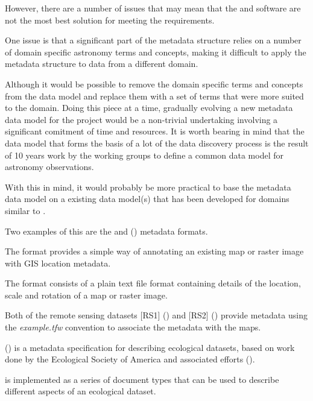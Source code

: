 \documentclass{article}
\begin{document}
However, there are a number of issues that may mean that the \cite{ivoa} and \cite{astro} software
are not the most best solution for meeting the \cite{trop} requirements.

One issue is that a significant part of the \cite{ivoa} metadata structure relies on a number of
domain specific astronomy terms and concepts, making it difficult to apply the \cite{ivoa}
metadata structure to data from a different domain.

Although it would be possible to remove the domain specific terms and concepts from
the \cite{ivoa} data model and replace them with a set of terms that were more suited to the
\cite{trop} domain.
Doing this piece at a time, gradually evolving a new metadata data model for the
\cite{trop} project would be a non-trivial undertaking involving a significant
comitment of time and resources.
It is worth bearing in mind that the \cite{ivoa} \cite{ivoa.obscore} data model
that forms the basis of a lot of the \cite{ivoa} data discovery process
is the result of 10 years work by the \cite{ivoa} working groups
to define a common data model for astronomy observations.

With this in mind, it would probably be more practical to base the \cite{trop} metadata
data model on a existing data model(s) that has been developed for domains similar to
\cite{trop}.

Two examples of this are the  and  (\cite{eml})
metadata formats.

The  format provides a simple way of annotating an existing map
or raster image with GIS location metadata.

The \cite{format-world} format consists of a plain text file format containing details of
the location, scale and rotation of a map or raster image.

Both of the remote sensing datasets
[RS1] (\cite{saatchi-2011})
and
[RS2] (\cite{baccini-2012})
provide
\cite{format-world}
metadata 
using the \textit{example.tfw} convention to associate the metadata
with the \cite{format-geotiff} maps.

 (\cite{eml}) is a metadata specification for describing ecological datasets,
based on work done by the Ecological Society of America and associated efforts
 (\cite{michener-1997}).

\cite{eml} is implemented as a series of \cite{format-xml} document types that can be
used to describe different aspects of an ecological dataset.
\end{document}
